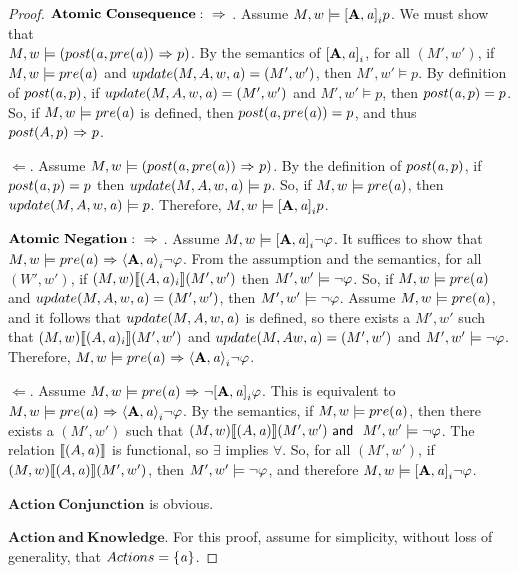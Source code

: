 \begin{proof}
$\mathbf{Atomic\ Consequence: \iimplies}$. Assume $M,w \models \mathbf{[A,\mathit{a}]}_ip$. We must show that \\$M,w \models (post(\mathit{a}, pre(\mathit{a})) {\ \Rightarrow \ } p)$. By the semantics of $\mathbf{[A,\mathit{a}]}_i$, for all $(M',w')$, if $M,w \models pre(\mathit{a})$ and $update(M,A,w,\mathit{a})= (M',w')$, then $M',w' \models p$. By definition of $post(\mathit{a},p)$, if $update(M,A,w,\mathit{a})=(M',w')$ and $M',w' \models p$, then $post(\mathit{a},p)=p$. So, if $M,w \models pre(\mathit{a})$ is defined, then $post(\mathit{a}, pre(\mathit{a})) = p$, and thus $post(A,p){\ \Rightarrow \ } p$. 

$\Leftarrow$. Assume $M,w \models (post(\mathit{a}, pre(\mathit{a})){\ \Rightarrow \ } p)$. By the definition of $post(\mathit{a},p)$, if $post(\mathit{a},p)=p$ then $update(M,A,w,\mathit{a})\models p$. So, if $M,w \models pre(\mathit{a})$, then $update(M,A,w,\mathit{a})\models p$. Therefore, $M,w\models \mathbf{[A,\mathit{a}]}_ip$.

$\mathbf{Atomic\ Negation: {\ \Rightarrow \ }}$. Assume $M,w \models \mathbf{[A,\mathit{a}]}_i{\neg} \varphi$. It suffices to show that $M,w \models pre(\mathit{a}) {\ \Rightarrow \ } \mathbf{\langle A,\mathit{a}\rangle}_i{\neg} \varphi$. From the assumption and the semantics, for all $(W',w')$, if $(M,w)\llbracket (A,\mathit{a})_i \rrbracket(M',w')$ then $M',w' \models {\neg} \varphi$. So, if $M,w \models pre(\mathit{a})$ and $update(M,A,w,\mathit{a})=(M',w')$, then $M',w' \models {\neg} \varphi$. Assume $M,w \models pre(\mathit{a})$, and it follows that $update(M,A,w,\mathit{a})$ is defined, so there exists a $M',w'$ such that $(M,w)\llbracket (A,\mathit{a})_i \rrbracket(M',w')$ and $update(M,A w,\mathit{a})=(M',w')$ and $M',w' \models {\neg} \varphi$. Therefore, $M,w \models pre(\mathit{a}) {\ \Rightarrow \ } \mathbf{\langle A,\mathit{a}\rangle}_i{\neg} \varphi$.

$\Leftarrow$. Assume $M,w \models pre(\mathit{a}) {\ \Rightarrow \ } {\neg} \mathbf{[A,\mathit{a}]}_i\varphi$. This is equivalent to $M,w \models pre(\mathit{a}) {\ \Rightarrow \ } \mathbf{\langle A,\mathit{a}\rangle}_i{\neg} \varphi$.  By the semantics, if $M,w \models pre(\mathit{a})$, then there exists a $(M',w')$ such that $(M,w)\llbracket (A,\mathit{a})\rrbracket (M',w') \textsf{\ and \ } M',w' \models {\neg} \varphi$. The relation $\llbracket (A,\mathit{a})\rrbracket$ is functional, so $\exists$ implies $\forall$. So, for all $(M',w')$, if $(M,w)\llbracket (A,\mathit{a})\rrbracket (M',w')$, then $M',w' \models {\neg} \varphi$, and therefore $M,w\models \mathbf{[A,\mathit{a}]}_i{\neg} \varphi$.

$\mathbf{Action\ Conjunction}$ is obvious.

$\mathbf{Action\ and\ Knowledge}$. For this proof, assume for simplicity, without loss of generality, that $Actions = \{\mathit{a}\}$.


\end{proof}
